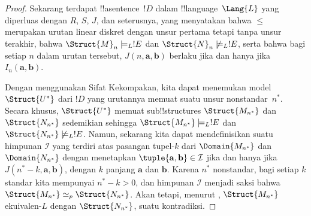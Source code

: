 \documentclass[../../../include/open-logic-section]{subfiles}
\begin{document}
\begin{proof}
Sekarang terdapat !!a{sentence}~$!D$ dalam !!{language}~$\Lang{L}$ yang
diperluas dengan $R$, $S$, $J$, dan seterusnya, yang menyatakan bahwa $\le$
merupakan urutan linear diskret dengan unsur pertama tetapi tanpa unsur
terakhir, bahwa $\Struct{M}_n \models_L !E$ dan $\Struct{N}_n \not\models_L !E$,
serta bahwa bagi setiap $n$ dalam urutan tersebut, $J(n, \mathbf{a},
\mathbf{b})$ berlaku jika dan hanya jika $I_n(\mathbf{a}, \mathbf{b})$.

Dengan menggunakan Sifat Kekompakan, kita dapat menemukan model
$\Struct{U^*}$ dari $!D$ yang urutannya memuat suatu unsur nonstandar~$n^*$.
Secara khusus, $\Struct{U^*}$ memuat sub!!{structure}s
$\Struct{M_{n^*}}$ dan
$\Struct{N_{n^*}}$ sedemikian sehingga $\Struct{M_{n^*}} \models_L !E$ dan
$\Struct{N_{n^*}} \not\models_L !E$. Namun, sekarang kita dapat mendefinisikan
suatu himpunan $\mathcal{I}$ yang terdiri atas pasangan tupel-$k$ dari
$\Domain{M_{n^*}}$ dan $\Domain{N_{n^*}}$ dengan menetapkan
$\tuple{\mathbf{a}, \mathbf{b}} \in \mathcal{I}$ jika dan hanya jika
$J(n^*-k, \mathbf{a}, \mathbf{b})$, dengan $k$ panjang $\mathbf{a}$ dan
$\mathbf{b}$. Karena $n^*$ nonstandar, bagi setiap $k$ standar kita mempunyai
$n^* - k > 0$, dan himpunan $\mathcal{I}$ menjadi saksi bahwa
$\Struct{M_{n^*}} \simeq_p \Struct{N_{n^*}}$. Akan tetapi, menurut
, $\Struct{M_{n^*}}$ ekuivalen-$L$ dengan
$\Struct{N_{n^*}}$, suatu kontradiksi.
\end{proof}
\end{document}
